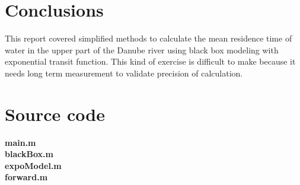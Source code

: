 \documentclass[a4paper,12pt]{article}
\begin{document}
\section{Conclusions}
This report covered simplified methods to calculate the mean residence time of water in the upper part of the Danube river using black box modeling with exponential transit function. This kind of exercise is difficult to make
because it needs long term measurement to validate precision of calculation. 
\section{Source code}
\textbf{main.m}\\

\textbf{blackBox.m}\\

\textbf{expoModel.m}\\

\textbf{forward.m}\\

\end{document}
